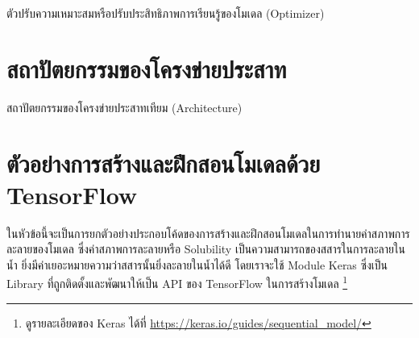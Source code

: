 ตัวปรับความเหมาะสมหรือปรับประสิทธิภาพการเรียนรู้ของโมเดล (Optimizer)

\section{สถาปัตยกรรมของโครงข่ายประสาท}
\label{sec:architecture}

สถาปัตยกรรมของโครงข่ายประสาทเทียม (Architecture)

\section{ตัวอย่างการสร้างและฝึกสอนโมเดลด้วย TensorFlow}

ในหัวข้อนี้จะเป็นการยกตัวอย่างประกอบโค้ดของการสร้างและฝึกสอนโมเดลในการทำนายค่าสภาพการละลายของโมเดล ซึ่งค่าสภาพการละลายหรือ
Solubility เป็นความสามารถของสสารในการละลายในน้ำ ยิ่งมีค่าเยอะหมายความว่าสสารนั้นยิ่งละลายในน้ำได้ดี โดยเราจะใช้ Module Keras 
ซึ่งเป็น Library ที่ถูกติดตั้งและพัฒนาให้เป็น API ของ TensorFlow ในการสร้างโมเดล
\footnote{ดูรายละเอียดของ Keras ได้ที่ \url{https://keras.io/guides/sequential_model/}}

